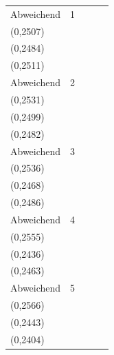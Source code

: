 {\begin{tabular}{llccc}
Abweichend & 1 & \shortstack{$0{,}2478 \pm 0{,}0225$\\(0{,}2507)} & \shortstack{$0{,}2462 \pm 0{,}0279$\\(0{,}2484)} & \shortstack{$0{,}2468 \pm 0{,}0216$\\(0{,}2511)} \\
Abweichend & 2 & \shortstack{$0{,}2467 \pm 0{,}0283$\\(0{,}2531)} & \shortstack{$0{,}2487 \pm 0{,}0268$\\(0{,}2499)} & \shortstack{$0{,}2488 \pm 0{,}0293$\\(0{,}2482)} \\
Abweichend & 3 & \shortstack{$0{,}2465 \pm 0{,}0426$\\(0{,}2536)} & \shortstack{$0{,}2446 \pm 0{,}0314$\\(0{,}2468)} & \shortstack{$0{,}2488 \pm 0{,}0274$\\(0{,}2486)} \\
Abweichend & 4 & \shortstack{$0{,}2423 \pm 0{,}0406$\\(0{,}2555)} & \shortstack{$0{,}2505 \pm 0{,}0267$\\(0{,}2436)} & \shortstack{$0{,}2529 \pm 0{,}0333$\\(0{,}2463)} \\
Abweichend & 5 & \shortstack{$0{,}2345 \pm 0{,}0432$\\(0{,}2566)} & \shortstack{$0{,}2454 \pm 0{,}0303$\\(0{,}2443)} & \shortstack{$0{,}2447 \pm 0{,}0301$\\(0{,}2404)} \\
\hline
\end{tabular}}
